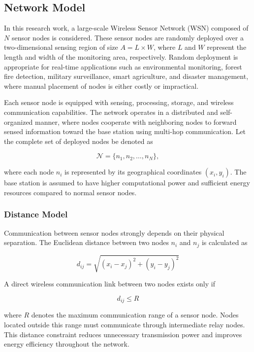 \documentclass[a4paper,fleqn]{cas-dc}
\numberwithin{equation}{section}
\begin{document}
\subsection{Network Model}

In this research work, a large-scale Wireless Sensor Network (WSN) composed of $N$ sensor nodes is considered. These sensor nodes are randomly deployed over a two-dimensional sensing region of size $A = L \times W$, where $L$ and $W$ represent the length and width of the monitoring area, respectively. Random deployment is appropriate for real-time applications such as environmental monitoring, forest fire detection, military surveillance, smart agriculture, and disaster management, where manual placement of nodes is either costly or impractical.

Each sensor node is equipped with sensing, processing, storage, and wireless communication capabilities. The network operates in a distributed and self-organized manner, where nodes cooperate with neighboring nodes to forward sensed information toward the base station using multi-hop communication. Let the complete set of deployed nodes be denoted as

\begin{equation}
\mathcal{N} = \{n_1, n_2, \ldots, n_N\},
\end{equation}

where each node $n_i$ is represented by its geographical coordinates $(x_i, y_i)$. The base station is assumed to have higher computational power and sufficient energy resources compared to normal sensor nodes.

\subsubsection{Distance Model}

Communication between sensor nodes strongly depends on their physical separation. The Euclidean distance between two nodes $n_i$ and $n_j$ is calculated as

\begin{equation}
\label{eq:dist}
d_{ij} = \sqrt{(x_i - x_j)^2 + (y_i - y_j)^2}
\end{equation}

A direct wireless communication link between two nodes exists only if

\begin{equation}
d_{ij} \leq R
\end{equation}

where $R$ denotes the maximum communication range of a sensor node. Nodes located outside this range must communicate through intermediate relay nodes. This distance constraint reduces unnecessary transmission power and improves energy efficiency throughout the network.
\end{document}
